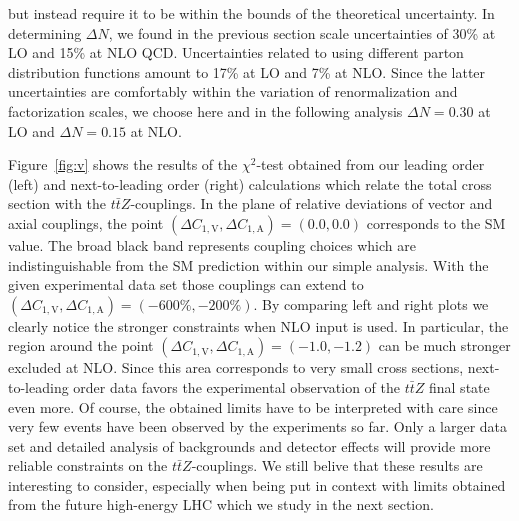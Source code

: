 \documentclass[preprint]{JHEP3} %
\def\ttbZ{t\bar{t}Z}
\def\DConeA{\Delta C_{1,\mathrm{A}}}
\def\DConeV{\Delta C_{1,\mathrm{V}}}
\begin{document}
but instead require it to be within the bounds of the theoretical uncertainty. 
In determining $\Delta N$, we found in the previous section scale uncertainties of 30\% at LO and 15\% at NLO QCD.
Uncertainties related to using different parton distribution functions amount to 17\% at LO and 7\% at NLO. 
Since the latter uncertainties are comfortably within the variation of renormalization and factorization scales, we 
choose here and in the following analysis $\Delta N = 0.30$ at LO and $\Delta N = 0.15$ at NLO.

Figure~\ref{fig:v} shows the results of the $\chi^2$-test obtained from our leading order (left) and next-to-leading order (right) calculations
which relate the total cross section with the $\ttbZ$-couplings.
In the plane of relative deviations of vector and axial couplings, the point $(\DConeV,\DConeA)=(0.0,0.0)$ corresponds to the SM value.
The broad black band represents coupling choices which are indistinguishable from the SM prediction within our simple analysis.
With the given experimental data set those couplings can extend to $(\DConeV,\DConeA)=(-600\%,-200\%)$.
By comparing left and right plots we clearly notice the stronger constraints when NLO input is used.
In particular, the region around the point $(\DConeV,\DConeA)=(-1.0,-1.2)$ can be much stronger excluded at NLO. 
Since this area corresponds to very small cross sections, next-to-leading order data favors the experimental observation of the $\ttbZ$ final state even more.
Of course, the obtained limits have to be interpreted with care since very few events have been observed by the experiments so far.
Only a larger data set and detailed analysis of backgrounds and detector effects will provide more reliable constraints on the $\ttbZ$-couplings.
We still belive that these results are interesting to consider, especially when being put in context with limits
obtained from the future high-energy LHC which we study in the next section.
\end{document}
